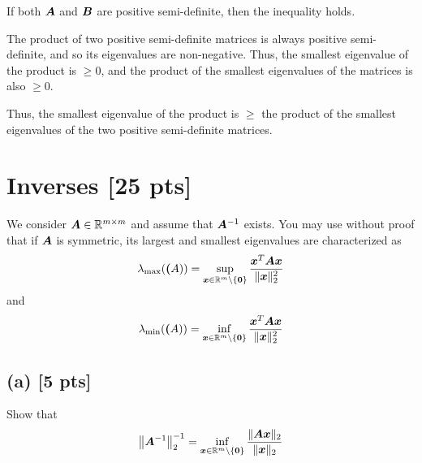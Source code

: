 \documentclass[twoside,10pt]{article}
\begin{document}
  If both $\bm{A}$ and $\bm{B}$ are positive semi-definite, then the inequality holds.

  The product of two positive semi-definite matrices is always positive semi-definite, and so its eigenvalues are non-negative.
  Thus, the smallest eigenvalue of the product is $\geq 0$, and the product of the smallest eigenvalues of the matrices is also $\geq 0$.

  Thus, the smallest eigenvalue of the product is $\geq$ the product of the smallest eigenvalues of the two positive semi-definite matrices.

\section{Inverses [25 pts]}
We consider $\bm{A} \in \mathbb{R}^{m \times m}$ and assume that $\bm{A}^{-1}$ exists. 
You may use without proof that if $\bm{A}$ is symmetric, its largest and smallest eigenvalues are characterized as 
\begin{equation*}
   \lambda_{\mathrm{max}}\left(\mtx(A)\right) = \sup \limits_{\vct{x} \in \R^m \setminus \{\vct{0}\}} \frac{\vct{x}^T \mtx{A}\vct{x}}{\|\vct{x}\|_2^2}
\end{equation*}
and 
\begin{equation*}
   \lambda_{\mathrm{min}}\left(\mtx(A)\right) = \inf \limits_{\vct{x} \in \R^m \setminus \{\vct{0}\}} \frac{\vct{x}^T \mtx{A}\vct{x}}{\|\vct{x}\|_2^2}
\end{equation*}


\subsection*{(a) [5 pts]}
Show that 
\begin{equation}
  \left\|\mtx{A}^{-1}\right\|_2^{-1} = \inf \limits_{\vct{x} \in \R^m \setminus \{\vct{0}\}} \frac{\|\mtx{A}\vct{x}\|_2}{\|\vct{x}\|_2}
\end{equation}
\end{document}
